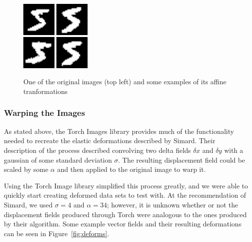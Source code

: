 \documentclass{article}
\begin{document}
\begin{figure}
  \centering
  \includegraphics[width=0.15\textwidth]{original.png}
  \includegraphics[width=0.15\textwidth]{transform1.png}\\
  \includegraphics[width=0.15\textwidth]{transform2.png}
  \includegraphics[width=0.15\textwidth]{transform3.png}
  \label{fig:transforms}
  \caption{One of the original images (top left) and some examples of its affine tranformations}
\end{figure}

\subsubsection{Warping the Images}

As stated above, the Torch Images library provides much of the functionality needed to recreate the elastic deformations described by Simard. Their description of the process described convolving two delta fields $\delta x$ and $\delta y$ with a gaussian of some standard deviation $\sigma$. The resulting displacement field could be scaled by some $\alpha$ and then applied to the original image to warp it.

Using the Torch Image library simplified this process greatly, and we were able to quickly start creating deformed data sets to test with. At the recommendation of Simard, we used $\sigma=4$ and $\alpha=34$; however, it is unknown whether or not the displacement fields produced through Torch were analogous to the ones produced by their algorithm. Some example vector fields and their resulting deformations can be seen in Figure~\ref{fig:deforms}.
\end{document}
